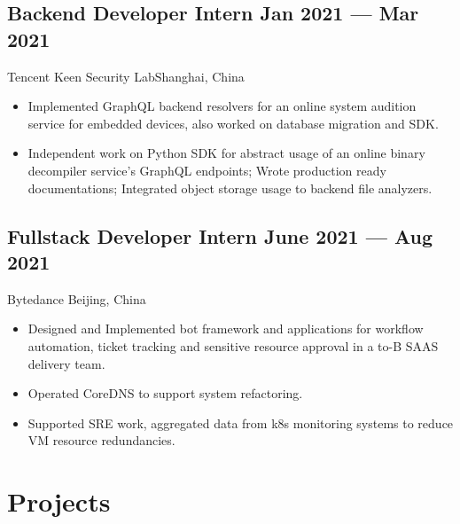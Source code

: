 \documentclass[a4,10pt]{article}
\newcommand{\subtext}[1]{
#1\par\vspace{-0.2cm}}
\newenvironment{zitemize}{
\begin{itemize}\itemsep0pt \parskip0pt \parsep1pt}
{\end{itemize}\vspace{-0.5cm}}
\begin{document}
\subsection*{Backend Developer Intern \hfill Jan 2021 --- Mar 2021} 
\subtext{Tencent Keen Security Lab\hfill Shanghai, China} 
    \begin{zitemize}
        \item Implemented GraphQL backend resolvers for an online system audition service for embedded devices, also worked on database migration and SDK.
        \item Independent work on Python SDK for abstract usage of an online binary decompiler service's GraphQL endpoints; Wrote production ready documentations; Integrated object storage usage to backend file analyzers.
    \end{zitemize}


\subsection*{Fullstack Developer Intern \hfill June 2021 --- Aug 2021} 
\subtext{Bytedance \hfill Beijing, China} 
    \begin{zitemize}
        \item Designed and Implemented bot framework and applications for workflow automation, ticket tracking and sensitive resource approval in a to-B SAAS delivery team.
        \item Operated CoreDNS to support system refactoring.
        \item Supported SRE work, aggregated data from k8s monitoring systems to reduce VM resource redundancies. 
    \end{zitemize}





\section{Projects} %
\end{document}
